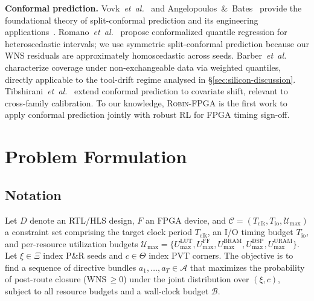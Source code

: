 \documentclass[journal]{IEEEtran}
\begin{document}
\textbf{Conformal prediction.} Vovk~\emph{et~al.}~\cite{vovk2022random} and Angelopoulos~\&~Bates~\cite{angelopoulos2023conformal} provide the foundational theory of split-conformal prediction and its engineering applications~\cite{angelopoulos2024conformal}. Romano~\emph{et~al.}~\cite{romano2019conformalized} propose conformalized quantile regression for heteroscedastic intervals; we use symmetric split-conformal prediction because our WNS residuals are approximately homoscedastic across seeds. Barber~\emph{et~al.}~\cite{barber2023conformal} characterize coverage under non-exchangeable data via weighted quantiles, directly applicable to the tool-drift regime analysed in \S\ref{sec:silicon-discussion}. Tibshirani~\emph{et~al.}~\cite{tibshirani2019conformal} extend conformal prediction to covariate shift, relevant to cross-family calibration. To our knowledge, \textsc{Robin-FPGA} is the first work to apply conformal prediction jointly with robust RL for FPGA timing sign-off.

\section{Problem Formulation}
\label{sec:formulation}

\subsection{Notation}
Let $D$ denote an RTL/HLS design, $F$ an FPGA device, and $\mathcal{C} = (T_{\text{clk}}, T_{\text{io}}, \mathcal{U}_{\max})$ a constraint set comprising the target clock period $T_{\text{clk}}$, an I/O timing budget $T_{\text{io}}$, and per-resource utilization budgets $\mathcal{U}_{\max} = \{U_{\max}^{\text{LUT}}, U_{\max}^{\text{FF}}, U_{\max}^{\text{BRAM}}, U_{\max}^{\text{DSP}}, U_{\max}^{\text{URAM}}\}$. Let $\xi \in \Xi$ index P\&R seeds and $c \in \Theta$ index PVT corners. The objective is to find a sequence of directive bundles $a_1, \ldots, a_T \in \mathcal{A}$ that maximizes the probability of post-route closure (WNS\,$\geq 0$) under the joint distribution over $(\xi, c)$, subject to all resource budgets and a wall-clock budget $\mathcal{B}$.
\end{document}
